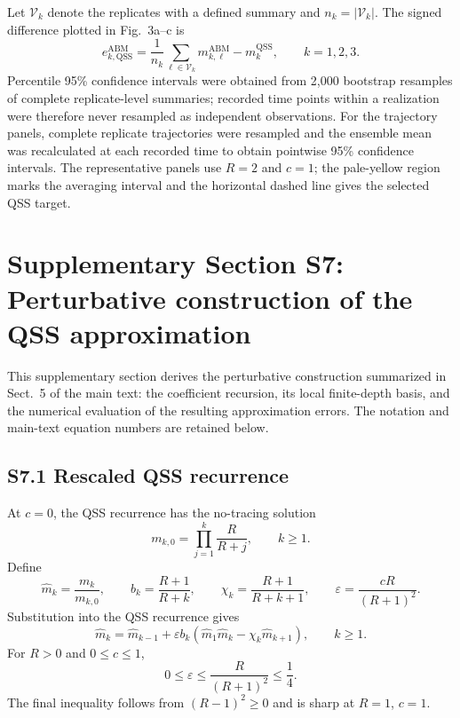 \documentclass[9pt,a4paper]{article}
\newcommand{\ABM}{\mathrm{ABM}}
\begin{document}
Let $\mathcal V_k$ denote the replicates with a defined summary and $n_k=|\mathcal V_k|$. The signed difference plotted in Fig.~3a--c is
\begin{equation}
e^{\ABM}_{k,\mathrm{QSS}}=\frac{1}{n_k}\sum_{\ell\in\mathcal V_k}m_{k,\ell}^{\ABM}-m_k^{\mathrm{QSS}},
\qquad k=1,2,3.
\tag{S4.19}
\end{equation}
Percentile 95\% confidence intervals were obtained from 2,000 bootstrap resamples of complete replicate-level summaries; recorded time points within a realization were therefore never resampled as independent observations. For the trajectory panels, complete replicate trajectories were resampled and the ensemble mean was recalculated at each recorded time to obtain pointwise 95\% confidence intervals. The representative panels use $R=2$ and $c=1$; the pale-yellow region marks the averaging interval and the horizontal dashed line gives the selected QSS target.

\section*{Supplementary Section S7: Perturbative construction of the QSS approximation}

This supplementary section derives the perturbative construction summarized in Sect.~5 of the main text: the coefficient recursion, its local finite-depth basis, and the numerical evaluation of the resulting approximation errors. The notation and main-text equation numbers are retained below.

\subsection*{S7.1 Rescaled QSS recurrence}

At $c=0$, the QSS recurrence has the no-tracing solution
\begin{equation}
m_{k,0}=\prod_{j=1}^{k}\frac{R}{R+j},
\qquad k\geq1.
\end{equation}
Define
\begin{equation}
\widehat m_k=\frac{m_k}{m_{k,0}},
\qquad
b_k=\frac{R+1}{R+k},
\qquad
\chi_k=\frac{R+1}{R+k+1},
\qquad
\varepsilon=\frac{cR}{(R+1)^2}.
\tag{S7.1}
\end{equation}
Substitution into the QSS recurrence gives
\begin{equation}
\widehat m_k=\widehat m_{k-1}+\varepsilon b_k\left(\widehat m_1\widehat m_k-\chi_k\widehat m_{k+1}\right),
\qquad k\geq1.
\tag{S7.2}
\end{equation}
For $R>0$ and $0\leq c\leq1$,
\begin{equation}
0\leq\varepsilon\leq\frac{R}{(R+1)^2}\leq\frac14.
\tag{S7.3}
\end{equation}
The final inequality follows from $(R-1)^2\geq0$ and is sharp at $R=1$, $c=1$.
\end{document}
